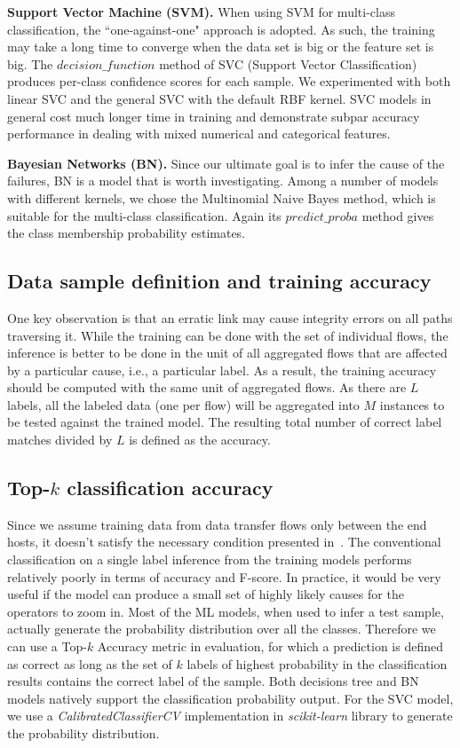 {\bf Support Vector Machine (SVM).} When using SVM for multi-class classification, the ``one-against-one" approach is adopted. As such, the training may take a long time to converge when the data set is big or the feature set is big. The $decision\_function$ method of SVC (Support Vector Classification) produces per-class confidence scores for each sample. We experimented with both linear SVC and the general SVC with the default RBF kernel. SVC models in general cost much longer time in training and demonstrate subpar accuracy performance in dealing with mixed numerical and categorical features.  

{\bf Bayesian Networks (BN).} Since our ultimate goal is to infer the cause of the failures, BN is a model that is worth investigating. Among a number of models with different kernels, we chose the Multinomial Naive Bayes method, which is suitable for the multi-class classification. Again its $predict\_proba$ method gives the class membership probability estimates.

\subsection{Data sample definition and training accuracy}
One key observation is that an erratic link may cause integrity errors on all paths traversing it. While the training can be done with the set of individual flows, the inference is better to be done in the unit of all aggregated flows that are affected by a particular cause, i.e., a particular label. As a result, the training accuracy should be computed with the same unit of aggregated flows. As there are $L$ labels, all the labeled data (one per flow) will be aggregated into $M$ instances to be tested against the trained model. The resulting total number of correct label matches divided by $L$ is defined as the accuracy.

\subsection{Top-$k$ classification accuracy} 
Since we assume training data from data transfer flows only between the end hosts, it doesn't satisfy the necessary condition presented in~\cite{netbouncer:nsdi18}. The conventional classification on a single label inference from the training models performs relatively poorly in terms of accuracy and F-score. In practice, it would be very useful if the model can produce a small set of highly likely causes for the operators to zoom in. Most of the ML models, when used to infer a test sample, actually generate the probability distribution over all the classes. Therefore we can use a Top-$k$ Accuracy metric in evaluation, for which a prediction is defined as correct as long as the set of $k$ labels of highest probability in the classification results contains the correct label of the sample. Both decisions tree and BN models natively support the classification probability output. For the SVC model, we use a \emph{CalibratedClassifierCV} implementation in {\it scikit-learn} library to generate the probability distribution.

